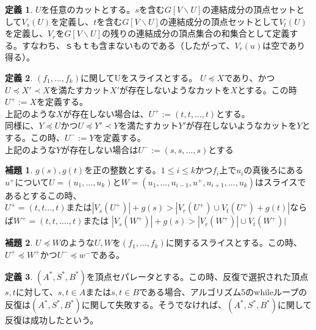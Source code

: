 \documentclass{jarticle}
\theoremstyle{definition}
\newtheorem{lemma}{補題}
\newtheorem{definition}{定義}
\begin{document}
\begin{definition}
    $U$を任意のカットとする。$s$を含む$G [V\backslash U]$の連結成分の頂点セットとして$V_s(U)$を定義し、$t$を含む$G [V\backslash U]$の連結成分の頂点セットとして$V_t(U)$を定義し、$V_r$を$G [V \backslash U]$の残りの連結成分の頂点集合の和集合として定義する。すなわち、$ｓ$も$ｔ$も含まないものである（したがって、$V_r(u)$は空であり得る）。
\end{definition}

\begin{definition}
    $(f_1,...,f_k)$に関してUをスライスとする。
    $U\preceq X$であり、かつ$U\preceq X'\prec X$を満たすカット$X'$が存在しないようなカットを$X$とする。この時$U^+:=X$を定義する。\\
    上記のような$X$が存在しない場合は、$U^+:=(t,t,...,t)$とする。\\
    同様に、$Y\preceq U$かつ$U\preceq Y'\prec Y$を満たすカット$Y'$が存在しないようなカットを$Y$とする。この時、$U^-:=Y$を定義する。\\
    上記のような$Y$が存在しない場合は$U^-:=(s,s,...,s)$とする 
\end{definition}

\begin{lemma}
    $g(s),g(t)$を正の整数とする。$1\leq i\leq k$かつ$f_i$上で$u_i$の真後ろにある$u^+$について$U=(u_1,...,u_k)$と$W=(u_1,...,u_{i-1},u^+,u_{i+1},...,u_k)$はスライスであるとするこの時、\\
    $U^+=(t,t...,t)$または$|V_s(U^+)|+g(s)>|V_r(U^+)\cup V_t(U^+)+g(t)|$ならば$W^+=(t,t,....,t)$または
    $|V_s(W^+)|+g(s)>|V_r(W^+)|\cup V_t(W^+)|$
\end{lemma}

\begin{lemma}
    $U \preceq W$のような$U,W$を$(f_1,...,f_k)$に関するスライスとする。この時、$U^+ \preceq W^+$かつ$U^- \preceq w^-$である。
\end{lemma}



\begin{definition}
    $(A^*,S^*,B^*)$を頂点セパレータとする。この時、反復で選択された頂点$s,t$に対して、$s,t\in A$または$s,t\in B$である場合、アルゴリズム5のwhileループの反復は$(A^*,S^*,B^*)$に関して失敗する。そうでなければ、$(A^*,S^*,B^*)$に関して反復は成功したという。
\end{definition}
   
\end{document}
